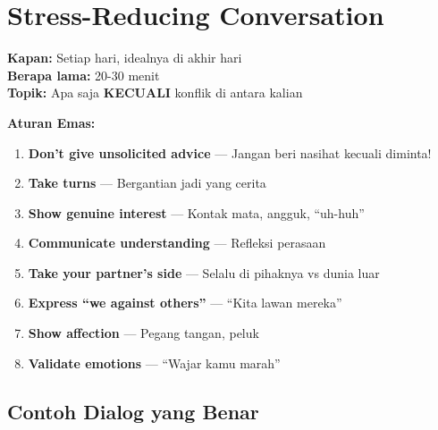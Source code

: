 \section{Stress-Reducing Conversation}

\begin{tipbox}
\textbf{Kapan:} Setiap hari, idealnya di akhir hari\\
\textbf{Berapa lama:} 20-30 menit\\
\textbf{Topik:} Apa saja \textbf{KECUALI} konflik di antara kalian

\textbf{Aturan Emas:}
\begin{enumerate}
    \item \textbf{Don't give unsolicited advice} --- Jangan beri nasihat kecuali diminta!
    \item \textbf{Take turns} --- Bergantian jadi yang cerita
    \item \textbf{Show genuine interest} --- Kontak mata, angguk, ``uh-huh''
    \item \textbf{Communicate understanding} --- Refleksi perasaan
    \item \textbf{Take your partner's side} --- Selalu di pihaknya vs dunia luar
    \item \textbf{Express ``we against others''} --- ``Kita lawan mereka''
    \item \textbf{Show affection} --- Pegang tangan, peluk
    \item \textbf{Validate emotions} --- ``Wajar kamu marah''
\end{enumerate}
\end{tipbox}

\subsection{Contoh Dialog yang Benar}

